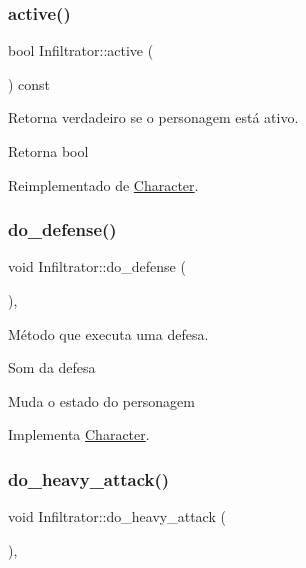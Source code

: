 \subsubsection{\texorpdfstring{active()}{active()}}
{\footnotesize\ttfamily bool Infiltrator\+::active (\begin{DoxyParamCaption}{ }\end{DoxyParamCaption}) const\hspace{0.3cm}{\ttfamily [virtual]}}



Retorna verdadeiro se o personagem está ativo. 

\begin{DoxyReturn}{Retorna}
bool 
\end{DoxyReturn}


Reimplementado de \mbox{\hyperlink{classCharacter_adbe9684ed82ce4b053881c1a31f2aa97}{Character}}.

\mbox{\label{classInfiltrator_afc1de0dd263b72b5be1da33f6cd9bbe7}} 
\subsubsection{\texorpdfstring{do\+\_\+defense()}{do\_defense()}}
{\footnotesize\ttfamily void Infiltrator\+::do\+\_\+defense (\begin{DoxyParamCaption}{ }\end{DoxyParamCaption})\hspace{0.3cm}{\ttfamily [protected]}, {\ttfamily [virtual]}}



Método que executa uma defesa. 

Som da defesa

Muda o estado do personagem 

Implementa \mbox{\hyperlink{classCharacter_ad8a87c4397e38fd4bd88c93a3d3cb70a}{Character}}.

\mbox{\label{classInfiltrator_a371e7c14076375ea21304220e826e5e0}} 
\subsubsection{\texorpdfstring{do\+\_\+heavy\+\_\+attack()}{do\_heavy\_attack()}}
{\footnotesize\ttfamily void Infiltrator\+::do\+\_\+heavy\+\_\+attack (\begin{DoxyParamCaption}{ }\end{DoxyParamCaption})\hspace{0.3cm}{\ttfamily [protected]}, {\ttfamily [virtual]}}



